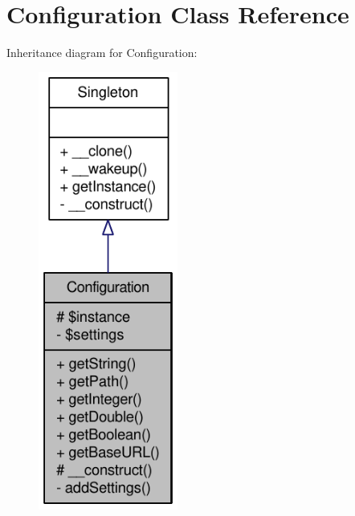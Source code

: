 \hypertarget{classConfiguration}{
\section{Configuration Class Reference}
\label{classConfiguration}
}


Inheritance diagram for Configuration:\nopagebreak
\begin{figure}[H]
\begin{center}
\leavevmode
\includegraphics[width=130pt]{classConfiguration__inherit__graph}
\end{center}
\end{figure}



